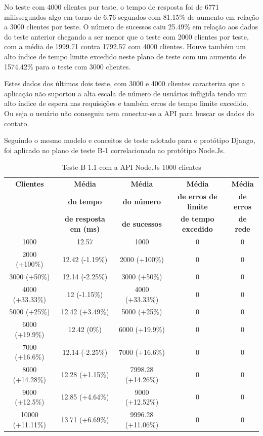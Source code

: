   No teste com 4000 clientes por teste, o tempo de resposta foi de 6771 milissegundos algo em torno de 6,76 segundos com  81.15\% de aumento
  em relação a 3000 clientes por teste. O número de sucessos caiu 25.49\% em relação aos dados do teste anterior chegando a ser menor que o
  teste com 2000 clientes por teste, com a média de 1999.71 contra 1792.57 com 4000 clientes. Houve também um alto índice de tempo limite excedido
  neste plano de teste com um aumento de 1574.42\% para o teste com 3000 clientes.

  Estes dados dos últimos dois teste, com 3000 e 4000 clientes caracteriza que a aplicação não suportou a alta escala de número de usuários infligida
  tendo um alto índice de espera nas requisições e também erros de tempo limite excedido. Ou seja o usuário não conseguiu nem conectar-se
  a API para buscar os dados do contato.

  Seguindo o mesmo modelo e conceitos de teste adotado para o protótipo Django, foi aplicado no plano de teste
  B-1 correlacionado ao protótipo Node.Js.

  \begin{table}[H]
    \centering
    \footnotesize
    \setlength{\abovecaptionskip}{0pt}
    \setlength{\belowcaptionskip}{0pt}
    \caption[Teste B-1.1 com a API 1000 clientes]{Teste B 1.1 com a API Node.Js 1000 clientes}
    \label{tab:teste-b-1-1}
    \begin{tabular}{c|c|c|c|c}
      \hline \hline
      \textbf{Clientes} & \textbf{Média} &	\textbf{Média} & \textbf{Média} & \textbf{Média}  \\
      		& \textbf{do tempo} &   \textbf{do número } & \textbf{de erros de limite} & \textbf{de erros}  \\
      		& \textbf{de resposta em (ms) } &\textbf{de sucessos } & \textbf{de tempo excedido} & \textbf{de rede} \\
      \hline \hline
      1000 &			12.57 & 		1000	 & 		0 &	0 \\
      2000 (+100\%)&		12.42 (-1.19\%) & 	2000 (+100\%) & 	0 &	0 \\
      3000 (+50\%)&		12.14 (-2.25\%) & 	3000 (+50\%) &	 	0 &	0 \\
      4000 (+33.33\%)&		12 (-1.15\%) & 		4000 (+33.33\%) & 	0 &	0 \\
      5000 (+25\%)&		12.42 (+3.49\%) & 	5000 (+25\%) & 		0 &	0 \\
      6000 (+19.9\%)&		12.42 (0\%) & 		6000 (+19.9\%) & 	0 &	0 \\
      7000 (+16.6\%)&		12.14 (-2.25\%) & 	7000 (+16.6\%) & 	0 &	0 \\
      8000 (+14.28\%)&		12.28 (+1.15\%) & 	7998.28 (+14.26\%) & 	0 &	0 \\
      9000 (+12.5\%)&		12.85 (+4.64\%) & 	9000 (+12.52\%) & 	0 &	0 \\
      10000 (+11.11\%)&		13.71 (+6.69\%) & 	9996.28 (+11.06\%)& 	0 &	0 \\
      \hline \hline
    \end{tabular}
  \end{table}


